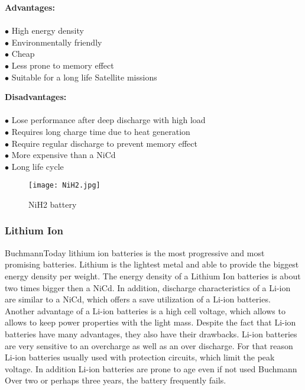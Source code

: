 \begin{multicols}{2}
	
	\textbf{Advantages:} \\ \\
	$\bullet$ High energy density\\
	$\bullet$ Environmentally friendly\\
	$\bullet$ Cheap\\
	$\bullet$ Less prone to memory effect\\
	$\bullet$ Suitable for a long life Satellite missions\\
	

	
	
	\columnbreak
	
	\textbf{Disadvantages:} \\ \\
	$\bullet$ Lose performance after deep discharge with high load\\
	$\bullet$ Requires long charge time due to heat generation\\
	$\bullet$ Require regular discharge to prevent memory effect\\ 
	$\bullet$ More expensive than a NiCd\\
	$\bullet$ Long life cycle

	
\end{multicols}

\begin{figure}[h]
	\centering
	\texttt{[image: NiH2.jpg]}
	\caption{ NiH2 battery \cite{10}}
	\label{fig: EPS}
\end{figure}

\subsubsection{Lithium Ion \label{sec:tech}}

Buchmann\cite{7}Today lithium ion batteries is the most progressive and most promising batteries. Lithium is the lightest metal and able to provide the biggest energy density per weight. The energy density of a Lithium Ion batteries is about two times bigger then a NiCd. In addition, discharge characteristics of a Li-ion are similar to a NiCd, which offers a save utilization of a Li-ion batteries. Another advantage of a Li-ion batteries is a high cell voltage, which allows to allows to keep power properties with the light mass. Despite the fact that Li-ion batteries have many advantages, they also have their drawbacks. Li-ion batteries are very sensitive to an overcharge as well as an over discharge. For that reason Li-ion batteries usually used with protection circuits, which limit the peak voltage. In addition Li-ion batteries are prone to age even if not used Buchmann\cite{7} Over two or perhaps three years, the battery frequently fails.


